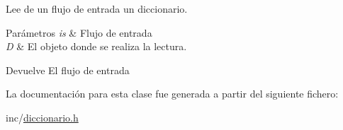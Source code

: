 Lee de un flujo de entrada un diccionario. 


\begin{DoxyParams}{Parámetros}
{\em is} & Flujo de entrada \\
\hline
{\em D} & El objeto donde se realiza la lectura. \\
\hline
\end{DoxyParams}
\begin{DoxyReturn}{Devuelve}
El flujo de entrada 
\end{DoxyReturn}


La documentación para esta clase fue generada a partir del siguiente fichero\+:\begin{DoxyCompactItemize}
\item 
inc/\hyperlink{diccionario_8h}{diccionario.\+h}\end{DoxyCompactItemize}

